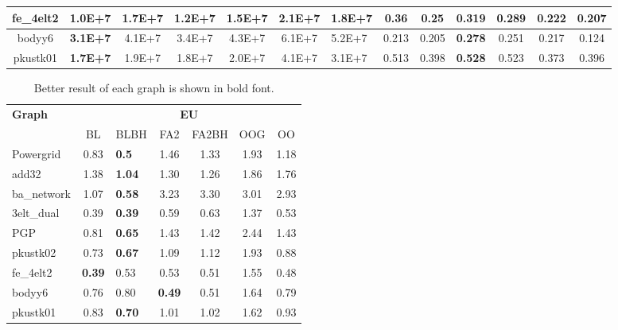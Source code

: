 \documentclass{vgtc}
\newcommand{\commentKhaled}[1]{{\color{black}{#1}}}
\begin{document}
\begin{table}[!t]
\begin{tabular}{|c|c|c|c|c|c|l|c|c|c|c|c|c|}
fe\_4elt2	&	\textbf{1.0E+7}	&	1.7E+7	&	1.2E+7	&	1.5E+7	&	2.1E+7	&	1.8E+7	&			\textbf{0.36}	&	0.25	&	0.319	&	0.289	&	0.222	&	0.207 \\ \hline

bodyy6	&	\textbf{3.1E+7}	&	4.1E+7	&	3.4E+7	&	4.3E+7	&	6.1E+7	&	5.2E+7	&			0.213	&	0.205	&	\textbf{0.278}	&	0.251	&	0.217	&	0.124 \\ \hline

pkustk01	&	\textbf{1.7E+7}	&	1.9E+7	&	1.8E+7	&	2.0E+7	&	4.1E+7	&	3.1E+7	&			0.513	&	0.398	&	\textbf{0.528}	&	0.523	&	0.373	&	0.396 \\ \hline

\end{tabular}
\label{tab:measures_st_np}
\vspace{-0.2cm}
\end{table}


\begin{table}[!t]
\caption{\commentKhaled{Comparison of Edge uniformity (EU) measures among all tools. For this measure, lower value means better result.} Better result of each graph is shown in bold font.}
\vspace{-4pt}
\centering
\begin{tabular}{|p{1.3cm}|c|p{0.7cm}|c|c|c|c|}
\hline
\multirow{2}{*}{\textbf{Graph}} &  \multicolumn{6}{c|}{\textbf{EU}}            \\ \cline{2-7} 
                                & BL & BLBH & FA2 & FA2BH & OOG & OO \\ \hline

Powergrid	&     0.83	&   \textbf{0.5}	&   1.46	&   1.33	&   1.93	&   1.18 \\ \hline

add32	&   1.38	&   \textbf{1.04}	&   1.30	&   1.26	&   1.86	&   1.76 \\ \hline

ba\_network	&     1.07	&   \textbf{0.58}	&   3.23	&   3.30	&   3.01	&   2.93 \\ \hline

3elt\_dual	&   0.39	&   \textbf{0.39}	&   0.59	&   0.63	&   1.37	&   0.53 \\ \hline

PGP	&  0.81	&   \textbf{0.65}	&   1.43	&   1.42	&   2.44	&   1.43 \\ \hline

pkustk02		&   0.73	&   \textbf{0.67}	&   1.09	&   1.12	&   1.93	&   0.88 \\ \hline

fe\_4elt2	&   \textbf{0.39}	&   0.53	&   0.53	&   0.51	&   1.55	&   0.48 \\ \hline

bodyy6	&   0.76	&   0.80	&   \textbf{0.49}	&   0.51	&   1.64	&   0.79 \\ \hline

pkustk01	&   	0.83	&   \textbf{0.70}	&   1.01	&   1.02	&   1.62	&  0.93 \\ \hline
\end{tabular}
\vspace{-0.5cm}
\label{tab:measures_ec_eu}
\end{table}
\end{document}
